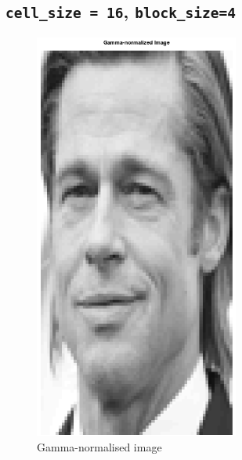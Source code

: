 \documentclass[a4paper]{article}
\begin{document}
\subsection{\texttt{cell_size = 16}, \texttt{block_size=4}}
\noindent
\begin{minipage}{0.49\textwidth}
\begin{figure}[H]
    \centering
    \includegraphics[width=0.6\textwidth]{./images/2_2_gamma-normalised.png}
    \caption{Gamma-normalised image}
\end{figure}
\end{minipage}
\hfill
\end{document}
